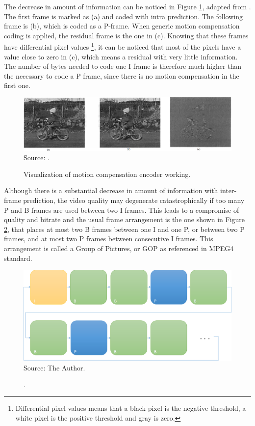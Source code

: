 \documentclass[
	12pt,				%
	openright,			%
	twoside,			%
	a4paper,			%
	brazil,
	french,				%
	english
	]{abntex2}
\begin{document}
The decrease in amount of information can be noticed in Figure \ref{fig:motion_compensation}, adapted from \cite{richardson}. The first frame is marked as (a) and coded with intra prediction. The following frame is (b), which is coded as a P-frame. When generic motion compensation coding is applied, the residual frame is the one in (c). Knowing that these frames have differential pixel values \footnote{Differential pixel values means that a black pixel is the negative threshold, a white pixel is the positive threshold and gray is zero.}, it can be noticed that most of the pixels have a value close to zero in (c), which means a residual with very little information. The number of bytes needed to code one I frame is therefore much higher than the necessary to code a P frame, since there is no motion compensation in the first one.

\begin{figure}
\centering
\caption{Visualization of motion compensation encoder working.}
\includegraphics[width=1\linewidth]{figuras/motion_compensation.png}
\\Source: \cite{richardson}.
\label{fig:motion_compensation}
\end{figure}

Although there is a substantial decrease in amount of information with inter-frame prediction, the video quality may degenerate catastrophically if too many P and B frames are used between two I frames. This leads to a compromise of quality and bitrate and the usual frame arrangement is the one shown in Figure \ref{fig:IBBPBBP}, that places at most two B frames between one I and one P, or between two P frames, and at most two P frames between consecutive I frames. This arrangement is called a Group of Pictures, or GOP as referenced in MPEG4 standard.

\begin{figure}
\centering
\caption{.}
\includegraphics[width=1\linewidth]{figuras/IBBPBBP.png}
\\Source: The Author.
\label{fig:IBBPBBP}
\end{figure}
\end{document}
